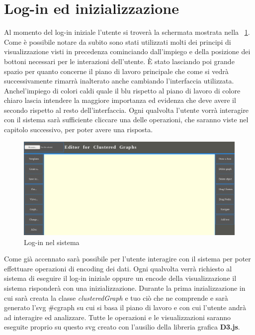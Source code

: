 {\section{Log-in ed inizializzazione}
Al momento del log-in iniziale l'utente si troverà la schermata mostrata nella \figurename~\ref{fig:interfaccia}. Come è possibile notare da subito sono stati utilizzati molti dei principi di visualizzazione visti in precedenza cominciando dall'impiego e della posizione dei bottoni necessari per le interazioni dell'utente. È stato lasciando poi grande spazio per quanto concerne il piano di lavoro principale che come si vedrà successivamente rimarrà inalterato anche cambiando l'interfaccia utilizzata. Anchel'impiego di colori caldi quale il blu rispetto al piano di lavoro di colore chiaro lascia intendere la maggiore importanza ed evidenza che deve avere il secondo rispetto al resto dell'interfaccia. Ogni qualvolta l'utente vorrà interagire con il sistema sarà sufficiente cliccare una delle operazioni, che saranno viste nel capitolo successivo, per poter avere una risposta.
\begin{figure}[!htb]
\begin{center}
	\includegraphics[width=1 \linewidth]{figure/interfaccia}
\end{center}
\caption{Log-in nel sistema\label{fig:interfaccia}}
\end{figure}
Come già accennato sarà possibile per l'utente interagire con il sistema per poter effettuare operazioni di encoding dei dati. Ogni qualvolta verrà richiesto al sistema di eseguire il log-in iniziale oppure un encode della visualizzazione il sistema risponderà con una inizializzazione. Durante la prima inzializzazione in cui sarà creata la classe \textit{clusteredGraph} e tuo ciò che ne comprende e sarà generato l'svg \#cgraph su cui si basa il piano di lavoro e con cui l'utente andrà ad interagire ed analizzare. Tutte le operazioni e le visualizzazioni saranno eseguite proprio su questo svg creato con l'ausilio della libreria grafica\textbf{ D3.js}.\\
}
